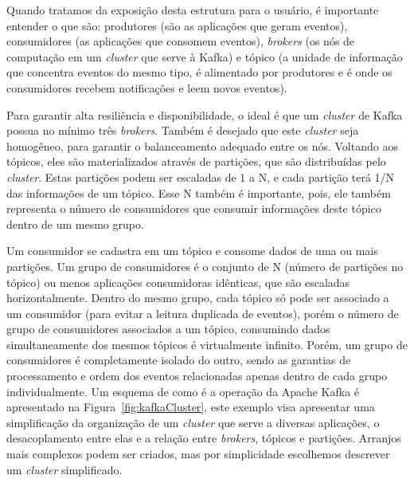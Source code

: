 \documentclass[12pt]{article}
\begin{document}
Quando tratamos da exposição desta estrutura para o usuário, é importante entender o que são: produtores (são as aplicações que geram eventos), consumidores (as aplicações que consomem eventos), \textit{brokers} (os nós de computação em um \textit{cluster} que serve à Kafka) e tópico (a unidade de informação que concentra eventos do mesmo tipo, é alimentado por produtores e é onde os consumidores recebem notificações e leem novos eventos).

Para garantir alta resiliência e disponibilidade, o ideal é que um \textit{cluster} de Kafka possua no mínimo três \textit{brokers}. Também é desejado que este \textit{cluster} seja homogêneo, para garantir o balanceamento adequado entre os nós. Voltando aos tópicos, eles são materializados através de partições, que são distribuídas pelo \textit{cluster}. Estas partições podem ser escaladas de 1 a N, e cada partição terá 1/N das informações de um tópico. Esse N também é importante, pois, ele também representa o número de consumidores que consumir informações deste tópico dentro de um mesmo grupo.

Um consumidor se cadastra em um tópico e consome dados de uma ou mais partições. Um grupo de consumidores é o conjunto de N (número de partições no tópico) ou menos aplicações consumidoras idênticas, que são escaladas horizontalmente. Dentro do mesmo grupo, cada tópico só pode ser associado a um consumidor (para evitar a leitura duplicada de eventos), porém o número de grupo de consumidores associados a um tópico, consumindo dados simultaneamente dos mesmos tópicos é virtualmente infinito. Porém, um grupo de consumidores é completamente isolado do outro, sendo as garantias de processamento e ordem dos eventos relacionadas apenas dentro de cada grupo individualmente. Um esquema de como é a operação da Apache Kafka é apresentado na Figura~\ref{fig:kafkaCluster}, este exemplo visa apresentar uma simplificação da organização de um \textit{cluster} que serve a diversas aplicações, o desacoplamento entre elas e a relação entre \textit{brokers}, tópicos e partições. Arranjos mais complexos podem ser criados, mas por simplicidade escolhemos descrever um \textit{cluster} simplificado.
\end{document}
